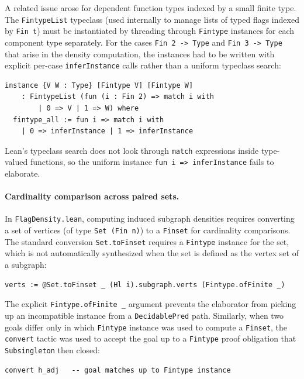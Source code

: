 \documentclass{article}
\newcommand{\lean}[1]{\texttt{#1}}
\begin{document}
A related issue arose for dependent function types indexed by a small finite
type.  The \lean{FintypeList} typeclass (used internally to manage lists of
typed flags indexed by \lean{Fin t}) must be instantiated by threading through
\lean{Fintype} instances for each component type separately.  For the cases
\lean{Fin 2 -> Type} and \lean{Fin 3 -> Type} that arise in the density
computation, the instances had to be written with explicit per-case
\lean{inferInstance} calls rather than a uniform typeclass search:
\begin{lstlisting}
instance {V W : Type} [Fintype V] [Fintype W]
    : FintypeList (fun (i : Fin 2) => match i with
        | 0 => V | 1 => W) where
  fintype_all := fun i => match i with
    | 0 => inferInstance | 1 => inferInstance
\end{lstlisting}
Lean's typeclass search does not look through \lean{match} expressions inside
type-valued functions, so the uniform instance \lean{fun i => inferInstance}
fails to elaborate.

\paragraph{Cardinality comparison across paired sets.}
In \lean{FlagDensity.lean}, computing induced subgraph densities requires
converting a set of vertices (of type \lean{Set (Fin n)}) to a \lean{Finset}
for cardinality comparisons.  The standard conversion
\lean{Set.toFinset} requires a \lean{Fintype} instance for the set, which is
not automatically synthesized when the set is defined as the vertex set of a
subgraph:
\begin{lstlisting}
verts := @Set.toFinset _ (Hl i).subgraph.verts (Fintype.ofFinite _)
\end{lstlisting}
The explicit \lean{Fintype.ofFinite \_} argument prevents the elaborator from
picking up an incompatible instance from a \lean{DecidablePred} path.
Similarly, when two goals differ only in which \lean{Fintype} instance was
used to compute a \lean{Finset}, the \lean{convert} tactic was used to accept
the goal up to a \lean{Fintype} proof obligation that \lean{Subsingleton}
then closed:
\begin{lstlisting}
convert h_adj   -- goal matches up to Fintype instance
\end{lstlisting}
\end{document}
